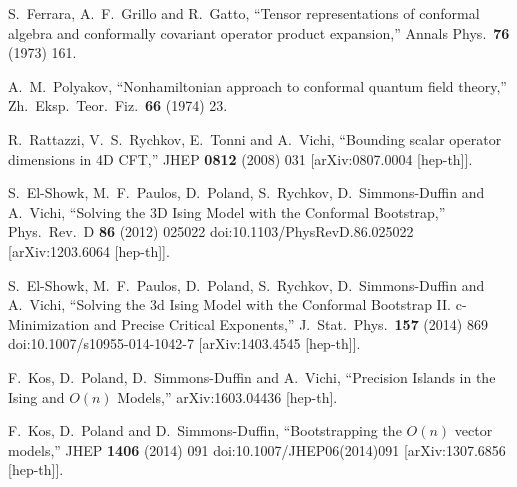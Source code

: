 \documentclass[letterpaper]{article}
\numberwithin{equation}{section}
\begin{document}
\begin{thebibliography}{10}

 
  S.~Ferrara, A.~F.~Grillo and R.~Gatto,
  ``Tensor representations of conformal algebra and conformally covariant operator product expansion,''
  Annals Phys.\  {\bf 76} (1973) 161.
  
  A.~M.~Polyakov,
  ``Nonhamiltonian approach to conformal quantum field theory,''
  Zh.\ Eksp.\ Teor.\ Fiz.\  {\bf 66} (1974) 23.


  R.~Rattazzi, V.~S.~Rychkov, E.~Tonni and A.~Vichi,
  ``Bounding scalar operator dimensions in 4D CFT,''
  JHEP {\bf 0812} (2008) 031
  [arXiv:0807.0004 [hep-th]].

  S.~El-Showk, M.~F.~Paulos, D.~Poland, S.~Rychkov, D.~Simmons-Duffin and A.~Vichi,
  ``Solving the 3D Ising Model with the Conformal Bootstrap,''
  Phys.\ Rev.\ D {\bf 86} (2012) 025022
  doi:10.1103/PhysRevD.86.025022
  [arXiv:1203.6064 [hep-th]].

  S.~El-Showk, M.~F.~Paulos, D.~Poland, S.~Rychkov, D.~Simmons-Duffin and A.~Vichi,
  ``Solving the 3d Ising Model with the Conformal Bootstrap II. c-Minimization and Precise Critical Exponents,''
  J.\ Stat.\ Phys.\  {\bf 157} (2014) 869
  doi:10.1007/s10955-014-1042-7
  [arXiv:1403.4545 [hep-th]].
  
  F.~Kos, D.~Poland, D.~Simmons-Duffin and A.~Vichi,
  ``Precision Islands in the Ising and $O(n)$ Models,''
  arXiv:1603.04436 [hep-th].
  
  F.~Kos, D.~Poland and D.~Simmons-Duffin,
  ``Bootstrapping the $O(n)$ vector models,''
  JHEP {\bf 1406} (2014) 091
  doi:10.1007/JHEP06(2014)091
  [arXiv:1307.6856 [hep-th]].



\end{thebibliography}

  
\end{document}
